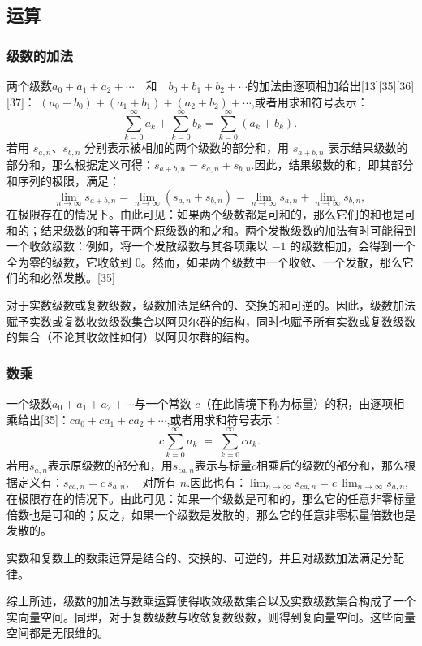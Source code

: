 \subsection{运算}
\subsubsection{级数的加法}
两个级数$a_{0} + a_{1} + a_{2} + \cdots \quad \text{和} \quad 
b_{0} + b_{1} + b_{2} + \cdots$的加法由逐项相加给出[13][35][36][37]：
$(a_{0}+b_{0}) + (a_{1}+b_{1}) + (a_{2}+b_{2}) + \cdots $,或者用求和符号表示：
$$
\sum_{k=0}^{\infty} a_{k} + \sum_{k=0}^{\infty} b_{k} 
= \sum_{k=0}^{\infty} (a_{k}+b_{k}).~
$$
若用 $s_{a,n}$、$s_{b,n}$ 分别表示被相加的两个级数的部分和，用 $s_{a+b,n}$ 表示结果级数的部分和，那么根据定义可得：$s_{a+b,n} = s_{a,n} + s_{b,n}$.因此，结果级数的和，即其部分和序列的极限，满足：
$$
\lim_{n \to \infty} s_{a+b,n} 
= \lim_{n \to \infty} (s_{a,n} + s_{b,n}) 
= \lim_{n \to \infty} s_{a,n} + \lim_{n \to \infty} s_{b,n},~
$$
在极限存在的情况下。由此可见：如果两个级数都是可和的，那么它们的和也是可和的；结果级数的和等于两个原级数的和之和。两个发散级数的加法有时可能得到一个收敛级数：例如，将一个发散级数与其各项乘以 $-1$ 的级数相加，会得到一个全为零的级数，它收敛到 0。然而，如果两个级数中一个收敛、一个发散，那么它们的和必然发散。[35]

对于实数级数或复数级数，级数加法是结合的、交换的和可逆的。因此，级数加法赋予实数或复数收敛级数集合以阿贝尔群的结构，同时也赋予所有实数或复数级数的集合（不论其收敛性如何）以阿贝尔群的结构。
\subsubsection{数乘}
一个级数$a_{0} + a_{1} + a_{2} + \cdots$与一个常数 $c$（在此情境下称为标量）的积，由逐项相乘给出[35]：$ca_{0} + ca_{1} + ca_{2} + \cdots $,或者用求和符号表示：
$$
c \sum_{k=0}^{\infty} a_{k} \;=\; \sum_{k=0}^{\infty} ca_{k}.~
$$
若用$s_{a,n}$表示原级数的部分和，用$s_{ca,n}$表示与标量$c$相乘后的级数的部分和，那么根据定义有：$s_{ca,n} = c \, s_{a,n}, \quad \text{对所有 } n$.因此也有：$\lim_{n \to \infty} s_{ca,n} = c \, \lim_{n \to \infty} s_{a,n}$,在极限存在的情况下。由此可见：如果一个级数是可和的，那么它的任意非零标量倍数也是可和的；反之，如果一个级数是发散的，那么它的任意非零标量倍数也是发散的。

实数和复数上的数乘运算是结合的、交换的、可逆的，并且对级数加法满足分配律。

综上所述，级数的加法与数乘运算使得收敛级数集合以及实数级数集合构成了一个实向量空间。同理，对于复数级数与收敛复数级数，则得到复向量空间。这些向量空间都是无限维的。

